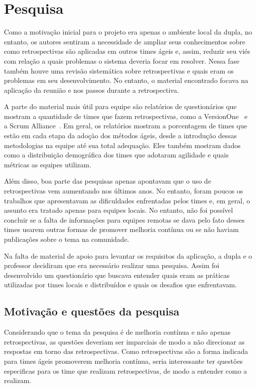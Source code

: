 \section{Pesquisa}

Como a motivação inicial para o projeto era apenas o ambiente local da dupla, no entanto, os autores sentiram a necessidade de ampliar seus conhecimentos sobre como retrospectivas são aplicadas em outros times ágeis e, assim, reduzir seu viés com relação a quais problemas o sistema deveria focar em resolver. Nessa fase também houve uma revisão sistemática sobre retrospectivas e quais eram os problemas em seu desenvolvimento. No entanto, o material encontrado focava na aplicação da reunião e nos passos durante a retrospectiva.

A parte do material mais útil para equipe são relatórios de questionários que mostram a quantidade de times que fazem retrospectivas, como a VersionOne~\cite{versionOne} e a Scrum Alliance~\cite{scrumAlliance}. Em geral, os relatórios mostram a porcentagem de times que estão em cada etapa da adoção dos métodos ágeis, desde a introdução dessas metodologias na equipe até sua total adequação. Eles também mostram dados como a distribuição demográfica dos times que adotaram agilidade e quais métricas as equipes utilizam.

Além disso, boa parte das pesquisas apenas apontavam que o uso de retrospectivas vem aumentando nos últimos anos. No entanto, foram poucos os trabalhos que apresentavam as dificuldades enfrentadas pelos times e, em geral, o assunto era tratado apenas para equipes locais. No entanto, não foi possível concluir se a falta de informações para equipes remotas se dava pelo fato desses times usarem outras formas de promover melhoria contínua ou se não haviam publicações sobre o tema na comunidade.

Na falta de material de apoio para levantar os requisitos da aplicação, a dupla e o professor decidiram que era necessário realizar uma pesquisa. Assim foi desenvolvido um questionário que buscava entender quais eram as práticas utilizadas por times locais e distribuídos e quais os desafios que enfrentavam.

\subsection{Motivação e questões da pesquisa}

Considerando que o tema da pesquisa é de melhoria contínua e não apenas retrospectivas, as questões deveriam ser imparciais de modo a não direcionar as respostas em torno das retrospectivas. Como retrospectivas são a forma indicada para times ágeis promoverem melhoria contínua, seria interessante ter questões especificas para os time que realizam retrospectivas, de modo a entender como a realizam.

